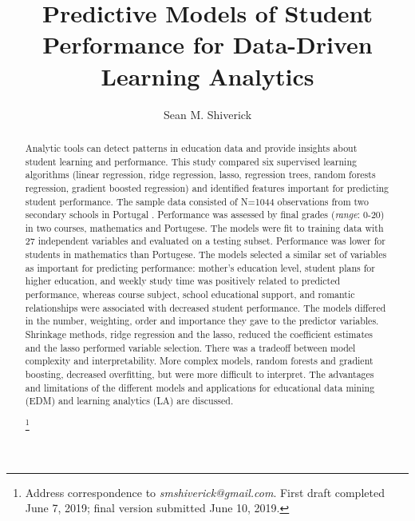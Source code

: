 \documentclass[sigconf]{acmart}
\begin{document}
  \title{Predictive Models of Student Performance for Data-Driven 
  Learning Analytics}
  \author{Sean M. Shiverick}
\renewcommand{\shortauthors}{S.M. Shiverick}


\begin{abstract}

Analytic tools can detect patterns in education data and provide insights about 
student learning and performance. This study compared six supervised learning 
algorithms (linear regression, ridge regression, lasso, regression trees, 
random forests regression, gradient boosted regression) and identified features 
important for predicting student performance. The sample data consisted of 
N=1044 observations from two secondary schools in Portugal \cite{cortez08}. 
Performance was assessed by final grades (\textit{range}: 0-20) in two courses, 
mathematics and Portugese. The models were fit to training data with 27
independent variables and evaluated on a testing subset. Performance was
lower for students in mathematics than Portugese. The models selected a 
similar set of variables as important for predicting performance: mother's 
education level, student plans for higher education, and weekly study time 
was positively related to predicted performance, whereas course subject, 
school educational support, and romantic relationships were associated with 
decreased student performance. The models differed in the number, weighting, 
order and importance they gave to the predictor variables. Shrinkage methods,
ridge regression and the lasso, reduced the coefficient estimates and the
lasso performed variable selection. There was a tradeoff between model 
complexity and interpretability. More complex models, random forests and 
gradient boosting, decreased overfitting, but were more difficult to interpret.   
The advantages and limitations of the different models and applications for 
educational data mining (EDM) and learning analytics (LA) are discussed. 

\footnote{Address correspondence to \textit{smshiverick@gmail.com}.
First draft completed June 7, 2019; final version submitted June 10, 2019.}

\end{abstract}
\maketitle
\end{document}
